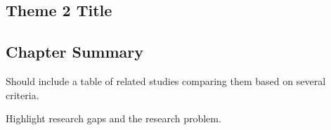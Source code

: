 \subsection{Theme 2 Title}

\subsection{Chapter Summary}
Should include a table of related studies comparing them based on several criteria.

Highlight research gaps and the research problem.













